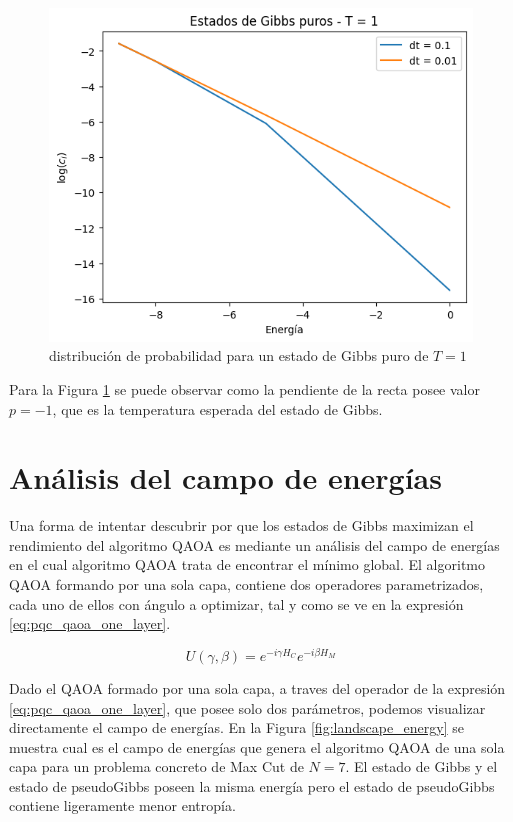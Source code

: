 \newpage

\begin{figure}[!h]
    \centering
    \includegraphics[scale = 0.7]{plt/a06-gibbs_state_pb.png}
    \caption{distribución de probabilidad para un estado de Gibbs puro de $T=1$}
    \label{fig:result_gibbs_pb}
\end{figure}

Para la Figura \ref{fig:result_gibbs_pb} se puede observar como la pendiente de la recta posee valor $p=-1$, que es la temperatura esperada del estado de Gibbs.

\section{Análisis del campo de energías}
\label{apendix:energy_landscape}

Una forma de intentar descubrir por que los estados de Gibbs maximizan el rendimiento del algoritmo QAOA es mediante un análisis del campo de energías en el cual algoritmo QAOA trata de encontrar el mínimo global. El algoritmo QAOA formando por una sola capa, contiene dos operadores parametrizados, cada uno de ellos con ángulo a optimizar, tal y como se ve en la expresión \ref{eq:pqc_qaoa_one_layer}.


\begin{equation}
    U(\gamma,\beta)= e^{-i \gamma H_C} e^{- i \beta H_M}
    \label{eq:pqc_qaoa_one_layer}
\end{equation}

Dado el QAOA formado por una sola capa, a traves del operador de la expresión \ref{eq:pqc_qaoa_one_layer}, que posee solo dos parámetros, podemos visualizar directamente el campo de energías. En la Figura \ref{fig:landscape_energy} se muestra cual es el campo de energías que genera el algoritmo QAOA de una sola capa para un problema concreto de Max Cut de $N=7$. El estado de Gibbs y el estado de pseudoGibbs poseen la misma energía pero el estado de pseudoGibbs contiene ligeramente menor entropía. 

